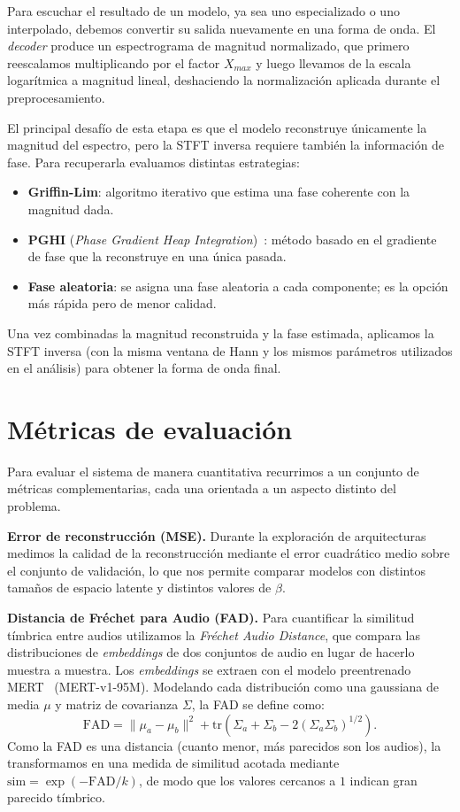 \documentclass[12pt,a4paper,twoside]{tesis}
\begin{document}
Para escuchar el resultado de un modelo, ya sea uno especializado o uno interpolado, debemos convertir su salida nuevamente en una forma de onda. El \textit{decoder} produce un espectrograma de magnitud normalizado, que primero reescalamos multiplicando por el factor $X_{max}$ y luego llevamos de la escala logarítmica a magnitud lineal, deshaciendo la normalización aplicada durante el preprocesamiento.

El principal desafío de esta etapa es que el modelo reconstruye únicamente la magnitud del espectro, pero la STFT inversa requiere también la información de fase. Para recuperarla evaluamos distintas estrategias:
\begin{itemize}
    \item \textbf{Griffin-Lim}: algoritmo iterativo que estima una fase coherente con la magnitud dada.
    \item \textbf{PGHI} (\textit{Phase Gradient Heap Integration})~\cite{prusa2017pghi}: método basado en el gradiente de fase que la reconstruye en una única pasada.
    \item \textbf{Fase aleatoria}: se asigna una fase aleatoria a cada componente; es la opción más rápida pero de menor calidad.
\end{itemize}
Una vez combinadas la magnitud reconstruida y la fase estimada, aplicamos la STFT inversa (con la misma ventana de Hann y los mismos parámetros utilizados en el análisis) para obtener la forma de onda final.

\newpage
\section{Métricas de evaluación}

Para evaluar el sistema de manera cuantitativa recurrimos a un conjunto de métricas complementarias, cada una orientada a un aspecto distinto del problema.

\textbf{Error de reconstrucción (MSE).} Durante la exploración de arquitecturas medimos la calidad de la reconstrucción mediante el error cuadrático medio sobre el conjunto de validación, lo que nos permite comparar modelos con distintos tamaños de espacio latente y distintos valores de $\beta$.

\textbf{Distancia de Fréchet para Audio (FAD).} Para cuantificar la similitud tímbrica entre audios utilizamos la \textit{Fréchet Audio Distance}, que compara las distribuciones de \textit{embeddings} de dos conjuntos de audio en lugar de hacerlo muestra a muestra. Los \textit{embeddings} se extraen con el modelo preentrenado MERT~\cite{li2023mert} (MERT-v1-95M). Modelando cada distribución como una gaussiana de media $\mu$ y matriz de covarianza $\Sigma$, la FAD se define como:
\begin{equation}
\mathrm{FAD} = \| \mu_a - \mu_b \|^2 + \mathrm{tr}\!\left(\Sigma_a + \Sigma_b - 2\left(\Sigma_a \Sigma_b\right)^{1/2}\right).
\end{equation}
Como la FAD es una distancia (cuanto menor, más parecidos son los audios), la transformamos en una medida de similitud acotada mediante $\mathrm{sim} = \exp(-\mathrm{FAD}/k)$, de modo que los valores cercanos a $1$ indican gran parecido tímbrico.
\end{document}
